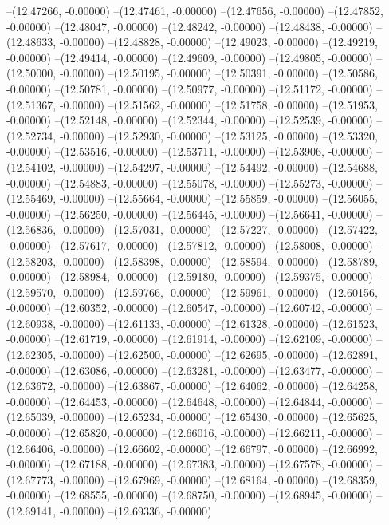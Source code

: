 --(12.47266, -0.00000)
--(12.47461, -0.00000)
--(12.47656, -0.00000)
--(12.47852, -0.00000)
--(12.48047, -0.00000)
--(12.48242, -0.00000)
--(12.48438, -0.00000)
--(12.48633, -0.00000)
--(12.48828, -0.00000)
--(12.49023, -0.00000)
--(12.49219, -0.00000)
--(12.49414, -0.00000)
--(12.49609, -0.00000)
--(12.49805, -0.00000)
--(12.50000, -0.00000)
--(12.50195, -0.00000)
--(12.50391, -0.00000)
--(12.50586, -0.00000)
--(12.50781, -0.00000)
--(12.50977, -0.00000)
--(12.51172, -0.00000)
--(12.51367, -0.00000)
--(12.51562, -0.00000)
--(12.51758, -0.00000)
--(12.51953, -0.00000)
--(12.52148, -0.00000)
--(12.52344, -0.00000)
--(12.52539, -0.00000)
--(12.52734, -0.00000)
--(12.52930, -0.00000)
--(12.53125, -0.00000)
--(12.53320, -0.00000)
--(12.53516, -0.00000)
--(12.53711, -0.00000)
--(12.53906, -0.00000)
--(12.54102, -0.00000)
--(12.54297, -0.00000)
--(12.54492, -0.00000)
--(12.54688, -0.00000)
--(12.54883, -0.00000)
--(12.55078, -0.00000)
--(12.55273, -0.00000)
--(12.55469, -0.00000)
--(12.55664, -0.00000)
--(12.55859, -0.00000)
--(12.56055, -0.00000)
--(12.56250, -0.00000)
--(12.56445, -0.00000)
--(12.56641, -0.00000)
--(12.56836, -0.00000)
--(12.57031, -0.00000)
--(12.57227, -0.00000)
--(12.57422, -0.00000)
--(12.57617, -0.00000)
--(12.57812, -0.00000)
--(12.58008, -0.00000)
--(12.58203, -0.00000)
--(12.58398, -0.00000)
--(12.58594, -0.00000)
--(12.58789, -0.00000)
--(12.58984, -0.00000)
--(12.59180, -0.00000)
--(12.59375, -0.00000)
--(12.59570, -0.00000)
--(12.59766, -0.00000)
--(12.59961, -0.00000)
--(12.60156, -0.00000)
--(12.60352, -0.00000)
--(12.60547, -0.00000)
--(12.60742, -0.00000)
--(12.60938, -0.00000)
--(12.61133, -0.00000)
--(12.61328, -0.00000)
--(12.61523, -0.00000)
--(12.61719, -0.00000)
--(12.61914, -0.00000)
--(12.62109, -0.00000)
--(12.62305, -0.00000)
--(12.62500, -0.00000)
--(12.62695, -0.00000)
--(12.62891, -0.00000)
--(12.63086, -0.00000)
--(12.63281, -0.00000)
--(12.63477, -0.00000)
--(12.63672, -0.00000)
--(12.63867, -0.00000)
--(12.64062, -0.00000)
--(12.64258, -0.00000)
--(12.64453, -0.00000)
--(12.64648, -0.00000)
--(12.64844, -0.00000)
--(12.65039, -0.00000)
--(12.65234, -0.00000)
--(12.65430, -0.00000)
--(12.65625, -0.00000)
--(12.65820, -0.00000)
--(12.66016, -0.00000)
--(12.66211, -0.00000)
--(12.66406, -0.00000)
--(12.66602, -0.00000)
--(12.66797, -0.00000)
--(12.66992, -0.00000)
--(12.67188, -0.00000)
--(12.67383, -0.00000)
--(12.67578, -0.00000)
--(12.67773, -0.00000)
--(12.67969, -0.00000)
--(12.68164, -0.00000)
--(12.68359, -0.00000)
--(12.68555, -0.00000)
--(12.68750, -0.00000)
--(12.68945, -0.00000)
--(12.69141, -0.00000)
--(12.69336, -0.00000)
